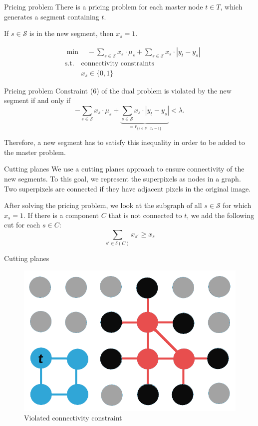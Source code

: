 \documentclass[fleqn]{beamer}
\newcommand{\superpixels}{\mathcal{S}}
\begin{document}
	\begin{frame}{Pricing problem}
		There is a pricing problem for each master node $t\in T$,
		which generates a segment containing $t$.
		
		If $s\in\superpixels$ is in the new segment, then $x_s=1$.		
		 
		\begin{align}
    		&\min\quad -\sum_{s\in\superpixels} x_s\cdot\mu_s + \sum_{s\in\superpixels} x_s\cdot|y_t-y_s| \\
    		&\text{s.t.}\quad \text{connectivity constraints} \\
	    	&\phantom{\text{s.t.}\quad} x_s \in\{0,1\}
		\end{align}
	\end{frame}
	
	\begin{frame}{Pricing problem}
		Constraint (6) of the dual problem is violated by the new segment if and only if
		\[-\sum_{s\in\superpixels} x_s\cdot\mu_s + \underbrace{\sum_{s\in\superpixels} x_s\cdot|y_t-y_s|}_{=r_{\{s\in\superpixels\ :\ x_s=1\}}} < \lambda.\]
        
		Therefore, a new segment has to satisfy this inequality in order to be added to the master problem.
	\end{frame}
    
	\begin{frame}{Cutting planes}
		We use a cutting planes approach to ensure connectivity of the new segments.
        To this goal, we represent the superpixels as nodes in a graph.
        Two superpixels are connected if they have adjacent pixels in the original image.
		
		After solving the pricing problem,
		we look at the subgraph of all $s\in\superpixels$ for which $x_s=1$.
		If there is a component $C$ that is not connected to $t$,
		we add the following cut for each $s\in C$:
		\[\sum_{s'\in\delta(C)}x_{s'} \geq x_s\]
	\end{frame}

	\begin{frame}{Cutting planes}
		\begin{figure}
			\centering
			\includegraphics[scale=.3]{cuttingplanes.png}
			\caption{Violated connectivity constraint}
		\end{figure}
	\end{frame}
	
\end{document}
